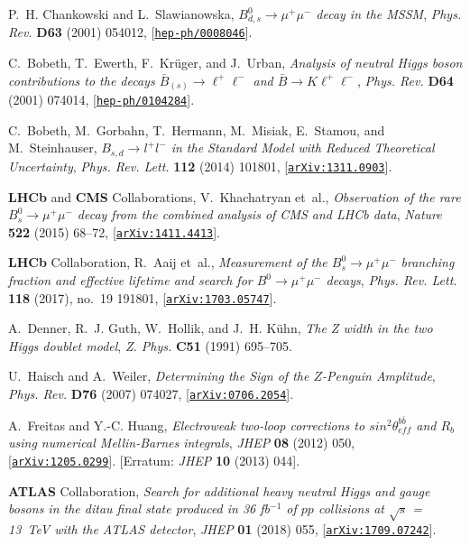 \documentclass[a4paper, 11pt,notoc]{article}
\begin{document}
\begin{thebibliography}{100}
P.~H. Chankowski and L.~Slawianowska, {\it {$B^0_{d,s} \to \mu^+ \mu^-$ decay
  in the MSSM}},  {\em Phys. Rev.} {\bf D63} (2001) 054012,
  [\href{http://arxiv.org/abs/hep-ph/0008046}{{\tt hep-ph/0008046}}].

C.~Bobeth, T.~Ewerth, F.~Kr{\"u}ger, and J.~Urban, {\it {Analysis of neutral
  Higgs boson contributions to the decays $\bar{B}_{(s)} \to \ell^{+} \ell^{-}$
  and $\bar{B} \to K \ell^{+} \ell^{-}$}},  {\em Phys. Rev.} {\bf D64} (2001)
  074014, [\href{http://arxiv.org/abs/hep-ph/0104284}{{\tt hep-ph/0104284}}].

C.~Bobeth, M.~Gorbahn, T.~Hermann, M.~Misiak, E.~Stamou, and M.~Steinhauser,
  {\it {$B_{s,d} \to l^+ l^-$ in the Standard Model with Reduced Theoretical
  Uncertainty}},  {\em Phys. Rev. Lett.} {\bf 112} (2014) 101801,
  [\href{http://arxiv.org/abs/1311.0903}{{\tt arXiv:1311.0903}}].

{\bf LHCb} and {\bf CMS} Collaborations, V.~Khachatryan et~al., {\it {Observation of the
  rare $B^0_s\to\mu^+\mu^-$ decay from the combined analysis of CMS and LHCb
  data}},  {\em Nature} {\bf 522} (2015) 68--72,
  [\href{http://arxiv.org/abs/1411.4413}{{\tt arXiv:1411.4413}}].

{\bf LHCb} Collaboration, R.~Aaij et~al., {\it {Measurement of the
  $B^0_s\to\mu^+\mu^-$ branching fraction and effective lifetime and search for
  $B^0\to\mu^+\mu^-$ decays}},  {\em Phys. Rev. Lett.} {\bf 118} (2017), no.~19
  191801, [\href{http://arxiv.org/abs/1703.05747}{{\tt arXiv:1703.05747}}].

A.~Denner, R.~J. Guth, W.~Hollik, and J.~H. K{\"u}hn, {\it {The Z width in the
  two Higgs doublet model}},  {\em Z. Phys.} {\bf C51} (1991) 695--705.

U.~Haisch and A.~Weiler, {\it {Determining the Sign of the $Z$-Penguin
  Amplitude}},  {\em Phys. Rev.} {\bf D76} (2007) 074027,
  [\href{http://arxiv.org/abs/0706.2054}{{\tt arXiv:0706.2054}}].

A.~Freitas and Y.-C. Huang, {\it {Electroweak two-loop corrections to $sin^{2}
  \theta^{b \bar b}_{eff}$ and $R_{b}$ using numerical Mellin-Barnes
  integrals}},  {\em JHEP} {\bf 08} (2012) 050,
  [\href{http://arxiv.org/abs/1205.0299}{{\tt arXiv:1205.0299}}]. [Erratum:
  {\it JHEP} {\bf 10} (2013) 044].

{\bf ATLAS} Collaboration, {\it {Search for additional heavy
  neutral Higgs and gauge bosons in the ditau final state produced in 36
  fb$^{-1}$ of $pp$ collisions at $ \sqrt{s}$ = 13~TeV with the ATLAS
  detector}},  {\em JHEP} {\bf 01} (2018) 055,
  [\href{http://arxiv.org/abs/1709.07242}{{\tt arXiv:1709.07242}}].
  

\end{thebibliography}
\end{document}
